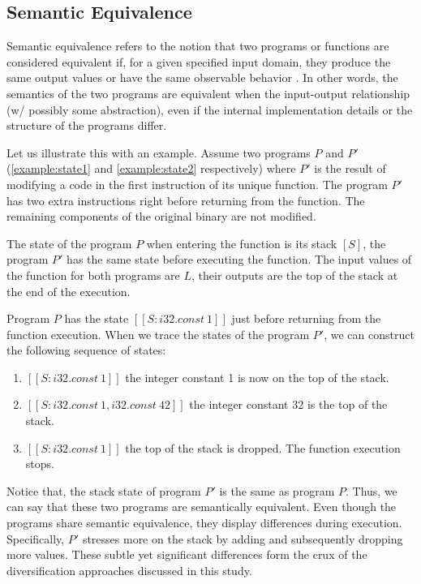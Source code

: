\documentclass[sigplan,screen]{acmart}
\begin{document}
\subsection{Semantic Equivalence}

Semantic equivalence refers to the notion that two programs or functions are considered equivalent if, for a given specified input domain, they produce the same output values or have the same observable behavior \cite{10.1145/2594291.2594334}. 
In other words, the semantics of the two programs are equivalent when the input-output relationship (w/ possibly some abstraction), even if the internal implementation details or the structure of the programs differ.


Let us illustrate this with an example.
Assume two programs $P$ and $P'$ (\autoref{example:state1} and \autoref{example:state2} respectively) where $P'$ is the result of modifying a code in the first instruction of its unique function.
The program $P'$ has two extra instructions right before returning from the function.
The remaining components of the original binary are not modified.




The state of the program $P$ when entering the function is its stack $[S]$, 
the program $P'$ has the same state before executing the function.
The input values of the function for both programs are $L$, their outputs are the top of the stack at the end of the execution.


Program $P$ has the state $[[S:i32.const\ 1]]$ just before returning from the function execution.
When we trace the states of the program $P'$, we can construct the following sequence of states:
\begin{enumerate}
    \item $[[S: i32.const\ 1]]$ the integer constant 1 is now on the top of the stack.
    \item $[[S: i32.const\ 1, i32.const\ 42]]$ the integer constant 32 is  the top of the stack.
    \item $[[S: i32.const\ 1]]$ the top of the stack is dropped. The function execution stops.
\end{enumerate}
Notice that, the stack state of program $P'$ is the same as program $P$.
Thus, we can say that these two programs are semantically equivalent.
Even though the programs share semantic equivalence, they display differences during execution. 
Specifically, $P'$ stresses more on the stack by adding and subsequently dropping more values.
These subtle yet significant differences form the crux of the diversification approaches discussed in this study.
\end{document}
